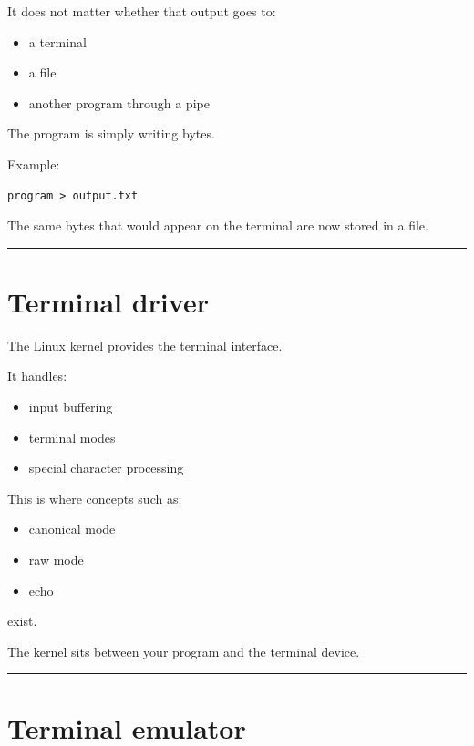 \documentclass[
  oneside,
  openany]{book}
\providecommand{\tightlist}{%
  \setlength{\itemsep}{0pt}\setlength{\parskip}{0pt}}
\begin{document}
It does not matter whether that output goes to:

\begin{itemize}
\tightlist
\item
  a terminal
\item
  a file
\item
  another program through a pipe
\end{itemize}

The program is simply writing bytes.

Example:

\begin{verbatim}
program > output.txt
\end{verbatim}

The same bytes that would appear on the terminal are now stored in a
file.

\begin{center}\rule{0.5\linewidth}{0.5pt}\end{center}

\hypertarget{terminal-driver}{%
\section{Terminal driver}\label{terminal-driver}}

The Linux kernel provides the terminal interface.

It handles:

\begin{itemize}
\tightlist
\item
  input buffering
\item
  terminal modes
\item
  special character processing
\end{itemize}

This is where concepts such as:

\begin{itemize}
\tightlist
\item
  canonical mode
\item
  raw mode
\item
  echo
\end{itemize}

exist.

The kernel sits between your program and the terminal device.

\begin{center}\rule{0.5\linewidth}{0.5pt}\end{center}

\hypertarget{terminal-emulator}{%
\section{Terminal emulator}\label{terminal-emulator}}
\end{document}
